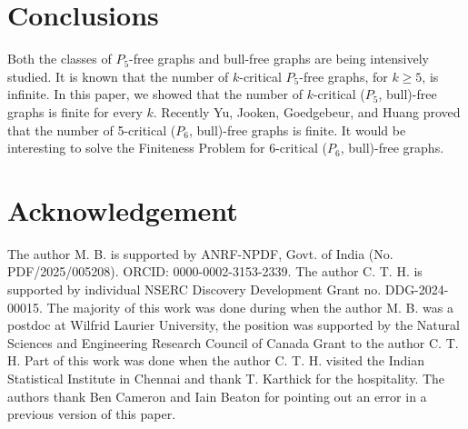 \documentclass[a4paper,11pt]{article}
\newtheorem{theorem}{Theorem}[section]
\theoremstyle{case}
\begin{document}

\section{Conclusions}\label{sec:conclusions}
Both the classes of $P_5$-free graphs and bull-free graphs are being intensively studied. It is known that the number of $k$-critical $P_5$-free graphs, for $ k \geq 5$, is infinite. In this paper, we showed that the number of $k$-critical ($P_5$, bull)-free graphs is finite for every $k$. Recently Yu, Jooken, Goedgebeur, and Huang \cite{YuJoo2026} proved that the number of 5-critical ($P_6$, bull)-free graphs is finite.  It would be interesting to solve the Finiteness Problem for 6-critical ($P_6$, bull)-free graphs.

\section{Acknowledgement}
 The author M. B. is supported by ANRF-NPDF, Govt. of India (No. PDF/2025/005208). ORCID: 0000-0002-3153-2339. The author C. T. H. is supported by individual NSERC Discovery Development Grant no. DDG-2024-00015. The majority of this work was done during when the author M. B. was a postdoc at Wilfrid Laurier University, the position was supported by the Natural Sciences and Engineering Research Council of Canada Grant to the author C. T. H. Part of this work was done when the author C. T. H. visited the Indian Statistical Institute in Chennai and thank T. Karthick for the hospitality. The authors thank Ben Cameron and Iain Beaton for pointing out an error in a previous version of this paper.
\end{document}
